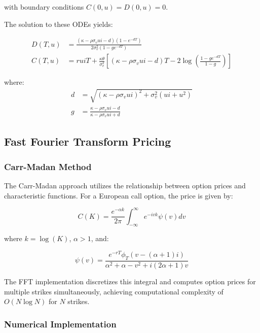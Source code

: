 \documentclass[12pt,a4paper]{article}
\begin{document}
with boundary conditions $C(0,u) = D(0,u) = 0$.

The solution to these ODEs yields:

\begin{align}
D(T,u) &= \frac{(\kappa - \rho\sigma_v ui - d)(1 - e^{-dT})}{2\sigma_v^2(1 - ge^{-dT})} \\
C(T,u) &= ru iT + \frac{\kappa\theta}{\sigma_v^2}\left[(\kappa - \rho\sigma_v ui - d)T - 2\log\left(\frac{1 - ge^{-dT}}{1 - g}\right)\right]
\end{align}

where:
\begin{align}
d &= \sqrt{(\kappa - \rho\sigma_v ui)^2 + \sigma_v^2(ui + u^2)} \\
g &= \frac{\kappa - \rho\sigma_v ui - d}{\kappa - \rho\sigma_v ui + d}
\end{align}

\subsection{Fast Fourier Transform Pricing}

\subsubsection{Carr-Madan Method}

The Carr-Madan approach \citep{carr1999option} utilizes the relationship between option prices and characteristic functions. For a European call option, the price is given by:

\begin{equation}
C(K) = \frac{e^{-\alpha k}}{2\pi} \int_{-\infty}^{\infty} e^{-ivk} \psi(v) dv
\end{equation}

where $k = \log(K)$, $\alpha > 1$, and:

\begin{equation}
\psi(v) = \frac{e^{-rT}\phi_T(v - (\alpha + 1)i)}{\alpha^2 + \alpha - v^2 + i(2\alpha + 1)v}
\end{equation}

The FFT implementation discretizes this integral and computes option prices for multiple strikes simultaneously, achieving computational complexity of $O(N \log N)$ for $N$ strikes.

\subsubsection{Numerical Implementation}
\end{document}
